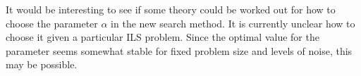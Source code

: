 \documentclass[12pt,Bold,letterpaper]{mcgilletdclass}
\begin{document}
It would be interesting to see if some theory could be worked out for how to choose the parameter $\alpha$ in the new search method. It is currently unclear how to choose it given a particular ILS problem. Since the optimal value for the parameter seems somewhat stable for fixed problem size and levels of noise, this may be possible.








\end{document}
